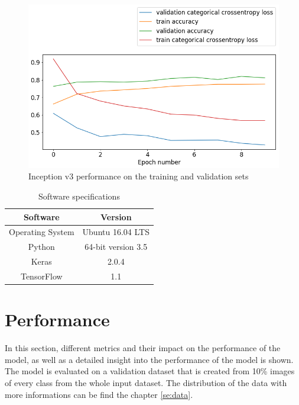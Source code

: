 \documentclass[times, utf8, diplomski]{fer}
\begin{document}
\begin{figure}
  \includegraphics[scale=0.61]{figures/inceptionv3_performance.png}
  \centering
  \caption{Inception v3 performance on the training and validation sets}
  \label{fig:inceptionv3_performance}
\end{figure}


\begin{table}
\centering
\caption{Software specifications}
\label{tb:software_specifications}
\begin{tabular}{cc}
\hline 
Software & Version \\ \hline 
Operating System & Ubuntu 16.04 LTS \\ 
Python & 64-bit version 3.5 \\ 
Keras & 2.0.4 \\
TensorFlow & 1.1 \\
\hline 
\end{tabular} 
\end{table}

\section{Performance}

In this section, different metrics and their impact on the performance of the model, as well as a detailed insight into the performance of the model is shown. The model is evaluated on a validation dataset that is created from 10\% images of every class from the whole input dataset. The distribution of the data with more informations can be find the chapter \ref{se:data}.
\end{document}
